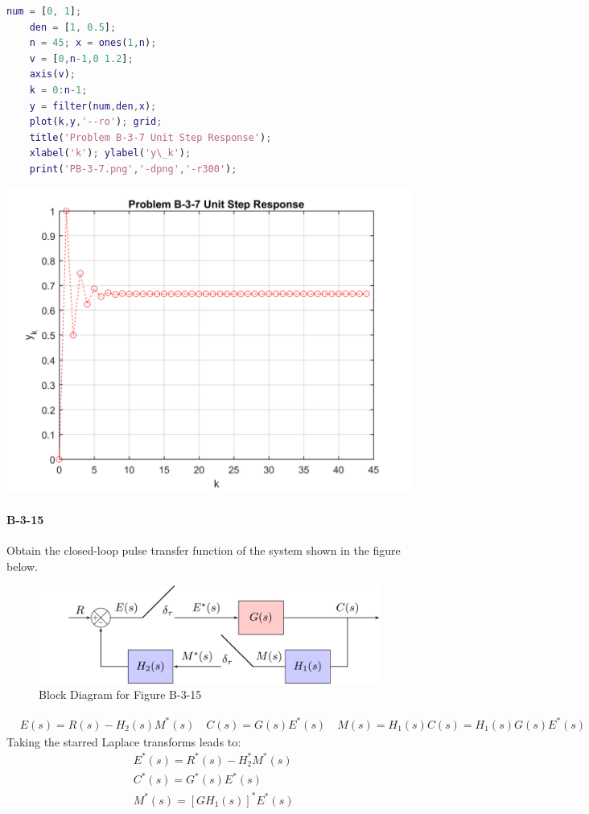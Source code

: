 {	\begin{lstlisting}[language=Matlab,caption=Matlab Code for B-2-17]
	num = [0, 1]; 
	den = [1, 0.5]; 
	n = 45; x = ones(1,n);
	v = [0,n-1,0 1.2];
	axis(v);
	k = 0:n-1;
	y = filter(num,den,x); 
	plot(k,y,'--ro'); grid;
	title('Problem B-3-7 Unit Step Response');
	xlabel('k'); ylabel('y\_k');
	print('PB-3-7.png','-dpng','-r300');
	\end{lstlisting}
\includegraphics[width=1\linewidth]{PB-3-7.png}


\vspace*{1cm}
\paragraph{B-3-15}

Obtain the closed-loop pulse transfer function of the system shown in the figure below.
\begin{figure}[H]
	\centering
	\includegraphics [width=0.85\linewidth]{samplerTesting.png}
	\caption{Block Diagram for Figure B-3-15}
	\label{fig:OgataB-3-15}
\end{figure}
\vspace*{-1cm}
\begin{align*}
& E (s) = R(s)- H_2(s)M^\ast(s) \quad C(s)= G(s)E^\ast(s)  \quad M(s)=H_1(s)C(s)=H_1(s)G(s) E^\ast(s) 
\end{align*}
Taking the starred Laplace transforms leads to:
\begin{align}
& E^\ast(s)=R^\ast(s)-H_2^\ast M^\ast(s) \\
& C^\ast(s) = G^\ast(s)E^\ast(s) \\ 
& M^\ast(s)= [GH_1(s)]^\ast  E^\ast(s)
\end{align}

}
